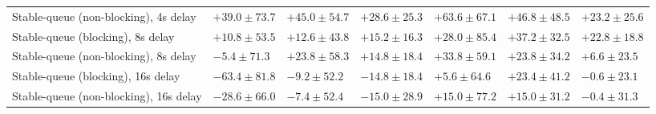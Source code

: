 \begin{table}[H]
{\begin{tabular}{l w{c}{5.0em} w{c}{5.0em} w{c}{5.0em} w{c}{5.0em} w{c}{5.0em} w{c}{5.0em}}
Stable-queue (non-blocking), 4s delay & $+39.0\pm73.7$ & $+45.0\pm54.7$ & $+28.6\pm25.3$ & $+63.6\pm67.1$ & $+46.8\pm48.5$ & $+23.2\pm25.6$ \\
Stable-queue (blocking), 8s delay & $+10.8\pm53.5$ & $+12.6\pm43.8$ & $+15.2\pm16.3$ & $+28.0\pm85.4$ & $+37.2\pm32.5$ & $+22.8\pm18.8$ \\
Stable-queue (non-blocking), 8s delay & $-5.4\pm71.3$ & $+23.8\pm58.3$ & $+14.8\pm18.4$ & $+33.8\pm59.1$ & $+23.8\pm34.2$ & $+6.6\pm23.5$ \\
Stable-queue (blocking), 16s delay & $-63.4\pm81.8$ & $-9.2\pm52.2$ & $-14.8\pm18.4$ & $+5.6\pm64.6$ & $+23.4\pm41.2$ & $-0.6\pm23.1$ \\
Stable-queue (non-blocking), 16s delay & $-28.6\pm66.0$ & $-7.4\pm52.4$ & $-15.0\pm28.9$ & $+15.0\pm77.2$ & $+15.0\pm31.2$ & $-0.4\pm31.3$ \\
\bottomrule
\end{tabular}%
}
\end{table}
